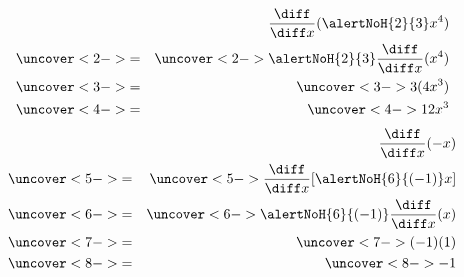\begin{frame}
\begin{example}[Example 2, p. 137]
\begin{columns}[t]
\begin{eqnarray*}
& & \frac{\diff}{\diff x} (\alertNoH{ 2}{3}x^4)\\
& \uncover<2->{ = } & %
\uncover<2->{\alertNoH{ 2}{3}\frac{\diff}{\diff x}(x^4)}\\
& \uncover<3->{ = } & %
\uncover<3->{3(4x^3)}\\
& \uncover<4->{ = } & %
\uncover<4->{12x^3}\\
\end{eqnarray*}
\begin{eqnarray*}
& & \frac{\diff}{\diff x} (-x)\\
& \uncover<5->{ = } & %
\uncover<5->{\frac{\diff}{\diff x}[\alertNoH{ 6}{(-1)}x]}\\
& \uncover<6->{ = } & %
\uncover<6->{\alertNoH{ 6}{(-1)}\frac{\diff}{\diff x}(x)}\\
& \uncover<7->{ = } & %
\uncover<7->{(-1)(1)}\\
& \uncover<8->{ = } & %
\uncover<8->{-1}\\
\end{eqnarray*}
\end{columns}
\end{example}
\end{frame}
